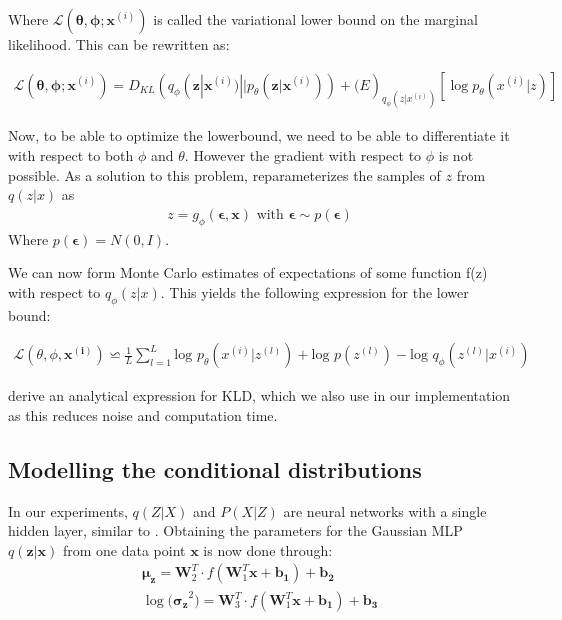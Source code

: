 \documentclass{article}
\begin{document}
Where $\mathcal{L}(\mathbf{\theta}, \mathbf{\phi}; \mathbf{x}^{(i)})$ is called the variational lower bound on the marginal likelihood. This can be rewritten as:

\begin{align}
\mathcal{L}(\mathbf{\theta}, \mathbf{\phi}; \mathbf{x}^{(i)}) = D_{KL}(q_\phi(\mathbf{z}|\mathbf{x}^{(i)}) || p_\theta(\mathbf{z}|\mathbf{x}^{(i)})) + \mathcal(E)_{q_\phi(z|x^{(i)})} [\log p_\theta(x^{(i)}|z)]
\end{align}

Now, to be able to optimize the lowerbound, we need to be able to differentiate it with respect to both $\phi$ and $\theta$. However the gradient with respect to $\phi$ is not possible. As a solution to this problem, \cite{kingma2013auto} reparameterizes the samples of $z$ from $q(z|x)$ as
\begin{align}
z = g_\phi(\mathbf{\epsilon},\mathbf{x}) \text{  with  } \mathbf{\epsilon} \sim p(\mathbf{\epsilon}) 
\end{align} 
Where $p(\mathbf{\epsilon}) = N(0,I)$.

We can now form Monte Carlo estimates of expectations of some function f(z) with respect to $q_\phi(z|x)$. This yields the following expression for the lower bound:

\begin{align}
\mathcal{L}(\theta ,\phi ,  \mathbf{x^{(i)}}) \backsimeq \frac{1}{L} \sum_{l=1}^{L} \text{log } p_{\theta} (x^{(i)}|z^{(l)})+ \text{log }p(z^{(l)}	)-\text{log }q_{\phi}(z^{(l)}|x^{(i)})
\end{align}

\cite{kingma2013auto} derive an analytical expression for KLD, which we also use in our implementation as this reduces noise and computation time. %


\subsection{Modelling the conditional distributions}
In our experiments, $q(Z|X)$ and $P(X|Z)$ are neural networks with a single hidden layer, similar to \cite{kingma2013auto}.  Obtaining the parameters for the Gaussian MLP $q(\mathbf{z}|\mathbf{x})$ from one data point $\mathbf{x}$ is now done through:
\begin{align}
\mathbf{\mu_z} = \mathbf{W}_2^T \cdot f(\mathbf{W}_1^T\mathbf{x}+\mathbf{b_1})+\mathbf{b_2} \\
\log\mathbf{(\sigma_z}^2) = \mathbf{W}_3^T \cdot f(\mathbf{W}_1^T\mathbf{x}+\mathbf{b_1})+\mathbf{b_3}
\end{align} 
 
\end{document}
